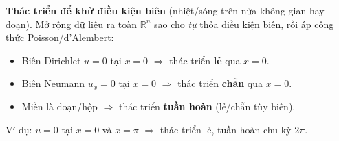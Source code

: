 \textbf{Thác triển để khử điều kiện biên} (nhiệt/sóng trên nửa không gian hay đoạn).
Mở rộng dữ liệu ra toàn $\mathbb{R}^n$ sao cho \emph{tự} thỏa điều kiện biên, rồi áp công thức Poisson/d'Alembert:
\begin{itemize}
  \item Biên Dirichlet $u=0$ tại $x=0$ $\Rightarrow$ thác triển \textbf{lẻ} qua $x=0$.
  \item Biên Neumann $u_x=0$ tại $x=0$ $\Rightarrow$ thác triển \textbf{chẵn} qua $x=0$.
  \item Miền là đoạn/hộp $\Rightarrow$ thác triển \textbf{tuần hoàn} (lẻ/chẵn tùy biên).
\end{itemize}
Ví dụ: $u=0$ tại $x=0$ và $x=\pi$ $\Rightarrow$ thác triển lẻ, tuần hoàn chu kỳ $2\pi$.

